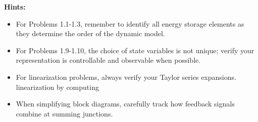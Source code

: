 \bigskip

\textbf{Hints:}
\begin{itemize}
\item For Problems 1.1-1.3, remember to identify all energy storage elements as they determine the order of the dynamic model.
\item For Problems 1.9-1.10, the choice of state variables is not unique; verify your representation is controllable and observable when possible.
\item For linearization problems, always verify your Taylor series expansions.
 linearization by computing\item When simplifying block diagrams, carefully track how feedback signals combine at summing junctions.
\end{itemize}
